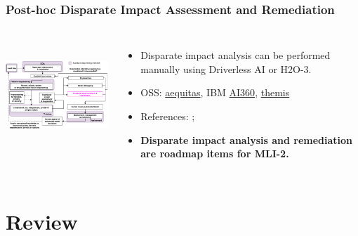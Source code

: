 \documentclass[11pt,
               aspectratio=169,
               hyperref={colorlinks}
               ]{beamer}
\begin{document}
			\begin{frame}		
		
			\frametitle{Post-hoc Disparate Impact Assessment and Remediation}		
			
			\begin{columns}
	
				\centering
				\includegraphics[height=120pt]{img/fair.png}
				
				\vspace{-5pt}
				\begin{itemize}
					\item Disparate impact analysis can be performed manually using Driverless AI or H2O-3.
					\item OSS: \href{https://github.com/dssg/aequitas}{aequitas}, IBM \href{https://github.com/IBM/AIF360}{AI360}, \href{https://github.com/LASER-UMASS/Themis}{themis}
					\item References: ;  
					\item \textbf{Disparate impact analysis and remediation are roadmap items for MLI-2.}
				\end{itemize}
				
			\end{columns}
		
		\end{frame}



	\section{Review}
\end{document}
